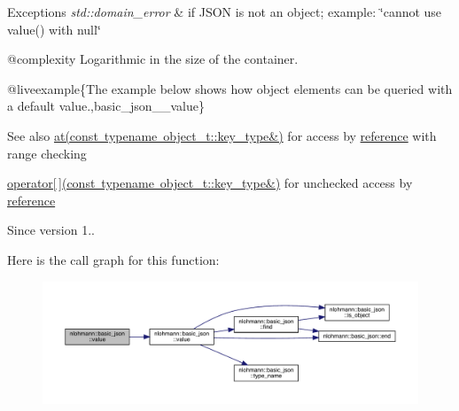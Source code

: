 \begin{DoxyExceptions}{Exceptions}
{\em std\+::domain\+\_\+error} & if J\+S\+ON is not an object; example\+: {\ttfamily \char`\"{}cannot use
value() with null\char`\"{}}\\
\hline
\end{DoxyExceptions}
@complexity Logarithmic in the size of the container.

@liveexample\{The example below shows how object elements can be queried with a default value.,basic\+\_\+json\+\_\+\+\_\+value\}

\begin{DoxySeeAlso}{See also}
\mbox{\hyperlink{classnlohmann_1_1basic__json_a93403e803947b86f4da2d1fb3345cf2c}{at(const typename object\+\_\+t\+::key\+\_\+type\&)}} for access by \mbox{\hyperlink{classnlohmann_1_1basic__json_ac6a5eddd156c776ac75ff54cfe54a5bc}{reference}} with range checking 

\mbox{\hyperlink{classnlohmann_1_1basic__json_a233b02b0839ef798942dd46157cc0fe6}{operator\mbox{[}$\,$\mbox{]}(const typename object\+\_\+t\+::key\+\_\+type\&)}} for unchecked access by \mbox{\hyperlink{classnlohmann_1_1basic__json_ac6a5eddd156c776ac75ff54cfe54a5bc}{reference}}
\end{DoxySeeAlso}
\begin{DoxySince}{Since}
version 1.. 
\end{DoxySince}
Here is the call graph for this function\+:\nopagebreak
\begin{figure}[H]
\begin{center}
\leavevmode
\includegraphics[width=350pt]{classnlohmann_1_1basic__json_ad6a18403e7fbac9c4efd06facc71fc88_cgraph}
\end{center}
\end{figure}
\mbox{\label{classnlohmann_1_1basic__json_ab7df4291dda0a80d86f74427cc3993ba}} 
